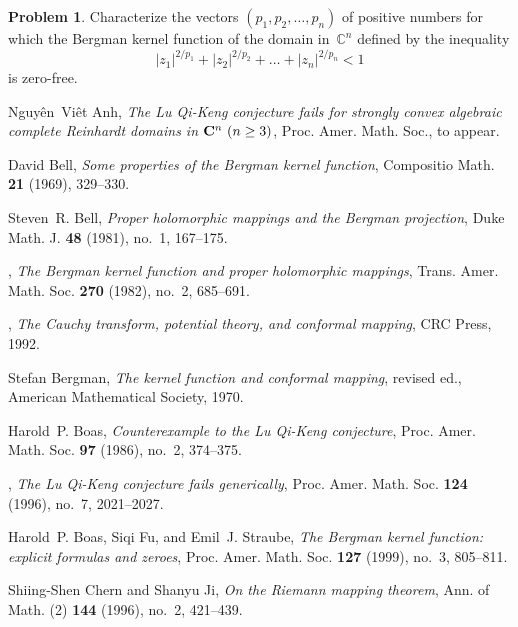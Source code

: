 \documentclass[12pt]{amsart}
\theoremstyle{definition}
\newtheorem{problem}{Problem}
\newcommand{\C}{\mathbb{C}}
\begin{document}
\begin{problem}
  Characterize the vectors \((p_1, p_2, \dots, p_n)\) of positive
  numbers for which the Bergman kernel function of the domain
  in~\(\C^n\) defined by the inequality
\begin{equation*}
|z_1|^{2/p_1}+|z_2|^{2/p_2} + \dots + |z_n|^{2/p_n} <1
\end{equation*}
is zero-free.
\end{problem}


% 

\begin{thebibliography}{10}

 Nguy\^en~Vi\^et Anh, \emph{The {L}u {Q}i-{K}eng
conjecture fails for strongly convex algebraic complete
{R}einhardt domains in $\mathbf{C}\sp n\ (n\ge3)$},
Proc. Amer. Math. Soc., to appear.

 David Bell, \emph{Some properties of the
{B}ergman kernel function}, Compositio Math. \textbf{21} (1969),
329--330.

 Steven~R. Bell, \emph{Proper holomorphic
mappings and the {B}ergman projection}, Duke Math. J. \textbf{48}
(1981), no.~1, 167--175.

 \bysame, \emph{The {B}ergman kernel function
and proper holomorphic mappings},
Trans. Amer. Math. Soc. \textbf{270} (1982), no.~2, 685--691.

 \bysame, \emph{The {C}auchy transform,
potential theory, and conformal mapping}, CRC Press, 1992.

 Stefan Bergman, \emph{The kernel function and
conformal mapping}, revised ed., American Mathematical Society,
1970.

 Harold~P. Boas, \emph{Counterexample
to the {L}u {Q}i-{K}eng conjecture}, Proc.
Amer. Math. Soc. \textbf{97} (1986), no.~2, 374--375.

 \bysame, \emph{The {L}u {Q}i-{K}eng
conjecture fails generically}, Proc. Amer.
Math. Soc. \textbf{124} (1996), no.~7, 2021--2027.

 Harold~P. Boas, Siqi Fu, and
Emil~J. Straube, \emph{The {B}ergman kernel function: explicit
formulas and zeroes}, Proc. Amer. Math. Soc. \textbf{127} (1999),
no.~3, 805--811.

 Shiing-Shen Chern and Shanyu Ji, \emph{On the
{R}iemann mapping theorem}, Ann.  of Math. (2) \textbf{144}
(1996), no.~2, 421--439.


\end{thebibliography}
\end{document}
